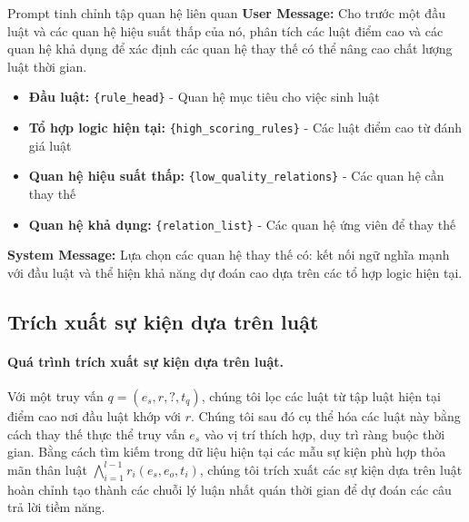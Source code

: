 \begin{promptbox}{Prompt tinh chỉnh tập quan hệ liên quan}
\textbf{User Message:}
Cho trước một đầu luật và các quan hệ hiệu suất thấp của nó, phân tích các luật điểm cao và các quan hệ khả dụng để xác định các quan hệ thay thế có thể nâng cao chất lượng luật thời gian.
\begin{itemize}
    \item \textbf{Đầu luật:} \texttt{\{rule\_head\}} - Quan hệ mục tiêu cho việc sinh luật
    \item \textbf{Tổ hợp logic hiện tại:} \texttt{\{high\_scoring\_rules\}} - Các luật điểm cao từ đánh giá luật
    \item \textbf{Quan hệ hiệu suất thấp:} \texttt{\{low\_quality\_relations\}} - Các quan hệ cần thay thế
    \item \textbf{Quan hệ khả dụng:} \texttt{\{relation\_list\}} - Các quan hệ ứng viên để thay thế
\end{itemize}

\textbf{System Message:} Lựa chọn các quan hệ thay thế có: kết nối ngữ nghĩa mạnh với đầu luật và thể hiện khả năng dự đoán cao dựa trên các tổ hợp logic hiện tại.
\end{promptbox}



\subsection{Trích xuất sự kiện dựa trên luật}

\paragraph{Quá trình trích xuất sự kiện dựa trên luật.}
Với một truy vấn $q = (e_s, r, ?, t_q)$, chúng tôi lọc các luật từ tập luật hiện tại điểm cao nơi đầu luật khớp với $r$. Chúng tôi sau đó cụ thể hóa các luật này bằng cách thay thế thực thể truy vấn $e_s$ vào vị trí thích hợp, duy trì ràng buộc thời gian. Bằng cách tìm kiếm trong dữ liệu hiện tại các mẫu sự kiện phù hợp thỏa mãn thân luật $\bigwedge_{i=1}^{l-1} r_i(e_s, e_o, t_i)$, chúng tôi trích xuất các sự kiện dựa trên luật hoàn chỉnh tạo thành các chuỗi lý luận nhất quán thời gian để dự đoán các câu trả lời tiềm năng.

